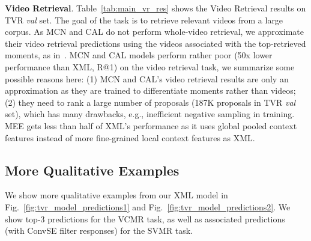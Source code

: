 \documentclass[runningheads]{llncs}
\begin{document}
\kern2mm
\noindent\textbf{Video Retrieval}.
Table~\ref{tab:main_vr_res} shows the Video Retrieval results on TVR \textit{val} set. The goal of the task is to retrieve relevant videos from a large corpus.
As MCN and CAL do not perform whole-video retrieval, we approximate their video retrieval predictions using the videos associated with the top-retrieved moments, as in~\cite{escorcia2019temporal}.
MCN and CAL models perform rather poor (50x lower performance than XML, R@1) on the video retrieval task, we summarize some possible reasons here: (1) MCN and CAL's video retrieval results are only an approximation as they are trained to differentiate moments rather than videos; (2) they need to rank a large number of proposals (187K proposals in TVR \textit{val} set), which has many drawbacks, e.g., inefficient negative sampling in training.
MEE gets less than half of XML's performance as it uses global pooled context features instead of more fine-grained local context features as XML.


\subsection{More Qualitative Examples}
We show more qualitative examples from our XML model in Fig.~\ref{fig:tvr_model_predictions1} and Fig.~\ref{fig:tvr_model_predictions2}. We show top-3 predictions for the VCMR task, as well as associated predictions (with ConvSE filter responses) for the SVMR task.
\end{document}
